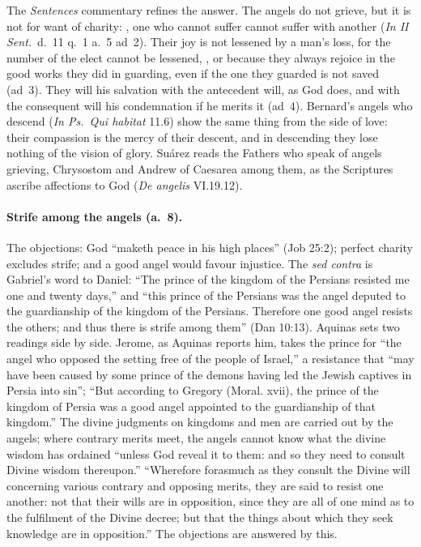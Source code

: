 The \emph{Sentences} commentary refines the answer. The angels do not grieve,
but it is not for want of charity: , one who cannot suffer cannot suffer with
another (\emph{In II Sent.}\ d.~11 q.~1 a.~5 ad~2). Their joy is not lessened
by a man's loss, for the number of the elect cannot be lessened, , or because they always
rejoice in the good works they did in guarding, even if the one they guarded
is not saved (ad~3). They will his salvation with the antecedent will, as God
does, and with the consequent will his condemnation if he merits it (ad~4).
Bernard's angels who descend  (\emph{In Ps.\ Qui
habitat} 11.6) show the same thing from the side of love: their compassion is
the mercy of their descent, and in descending they lose nothing of the
vision of glory. Suárez reads the Fathers who speak of angels grieving,
Chrysostom and Andrew of Caesarea among them, as the Scriptures ascribe
affections to God (\emph{De angelis} VI.19.12).

\paragraph{Strife among the angels (a.~8).} The objections: God ``maketh
peace in his high places'' (Job 25:2); perfect charity excludes strife; and
a good angel would favour injustice. The
\emph{sed contra} is Gabriel's word to Daniel: ``The prince of the kingdom of
the Persians resisted me one and twenty days,'' and ``this prince of the
Persians was the angel deputed to the guardianship of the kingdom of the
Persians. Therefore one good angel resists the others; and thus there is
strife among them'' (Dan 10:13). Aquinas sets two readings side by side.
Jerome, as Aquinas reports him, takes the prince for ``the angel who opposed
the setting free of the people of Israel,'' a resistance that ``may have been
caused by some prince of the demons having led the Jewish captives in Persia
into sin''; ``But according to Gregory (Moral. xvii), the prince of the
kingdom of Persia was a good angel appointed to the guardianship of that
kingdom.'' The divine judgments on kingdoms and men are carried out by the
angels; where contrary merits meet, the angels cannot know what the divine
wisdom has ordained ``unless God reveal it to them: and so they need to
consult Divine wisdom thereupon.'' ``Wherefore forasmuch as they consult the
Divine will concerning various contrary and opposing merits, they are said
to resist one another: not that their wills are in opposition, since they
are all of one mind as to the fulfilment of the Divine decree; but that the
things about which they seek knowledge are in opposition.'' The objections
are answered by this.

